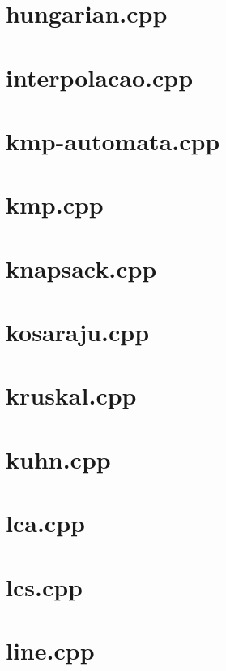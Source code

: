 \documentclass[a4paper,12pt]{article}
\begin{document}
\section{hungarian.cpp}


\section{interpolacao.cpp}


\section{kmp-automata.cpp}


\section{kmp.cpp}


\section{knapsack.cpp}


\section{kosaraju.cpp}


\section{kruskal.cpp}


\section{kuhn.cpp}


\section{lca.cpp}


\section{lcs.cpp}


\section{line.cpp}

\end{document}

